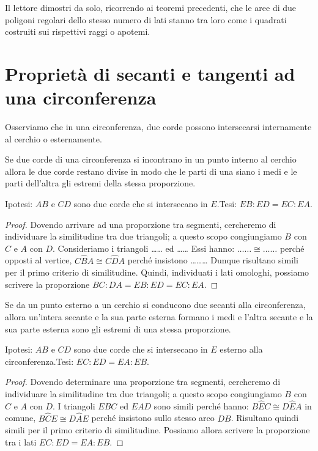Il lettore dimostri da solo, ricorrendo ai teoremi precedenti, che le aree di due poligoni regolari dello stesso numero di lati stanno tra loro come i quadrati costruiti sui rispettivi raggi o apotemi.


\section{Proprietà di secanti e tangenti ad una circonferenza}

Osserviamo che in una circonferenza, due corde possono intersecarsi internamente al cerchio o esternamente.
\begin{teorema}
Se due corde di una circonferenza si incontrano in un punto interno al cerchio allora le due corde restano divise in modo che le parti di una siano i medi e le parti dell'altra gli estremi della stessa proporzione.
\end{teorema}

\noindent Ipotesi: $AB$ e $CD$ sono due corde che si intersecano in $E$.\tab Tesi: $EB:ED=EC:EA$.

\begin{proof}
Dovendo arrivare ad una proporzione tra segmenti, cercheremo di individuare la similitudine tra due triangoli; a questo scopo congiungiamo $B$ con $C$ e $A$ con $D$. Consideriamo i triangoli \ldots\ldots{} ed \ldots\ldots{} Essi hanno: $\ldots\ldots{}\cong\ldots\ldots{}$ perché opposti al vertice, $C\widehat{B}A\cong C\widehat{D}A$ perché insistono \ldots\ldots\ldots{} Dunque risultano simili per il primo criterio di similitudine. Quindi, individuati i lati omologhi, possiamo scrivere la proporzione $BC:DA=EB:ED=EC:EA$.
\end{proof}

\begin{teorema}
Se da un punto esterno a un cerchio si conducono due secanti alla circonferenza, allora un'intera secante e la sua parte esterna formano i medi e l'altra secante e la sua parte esterna sono gli estremi di una stessa proporzione.
\end{teorema}

\noindent Ipotesi: $AB$ e $CD$ sono due corde che si intersecano in $E$ esterno alla circonferenza.\tab Tesi: $EC:ED=EA:EB$.

\begin{proof}
Dovendo determinare una proporzione tra segmenti, cercheremo di individuare la similitudine tra due triangoli; a questo scopo congiungiamo $B$ con $C$ e $A$ con $D$. I triangoli $EBC$ ed $EAD$ sono simili perché hanno: $B\widehat{E}C\cong D\widehat{E}A$ in comune, $B\widehat{C}E\cong D\widehat{A}E$ perché insistono sullo stesso arco $DB$. Risultano quindi simili per il primo criterio di similitudine. Possiamo allora scrivere la proporzione tra i lati $EC:ED=EA:EB$.
\end{proof}

